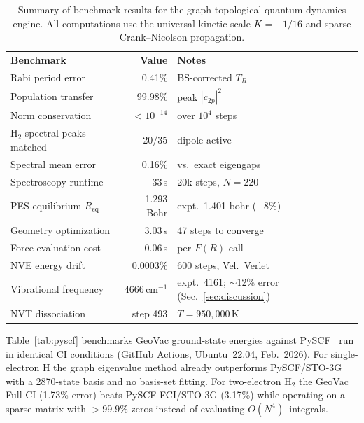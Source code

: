 \documentclass[aps,pra,twocolumn,superscriptaddress,longbibliography,floatfix]{revtex4-2}
\begin{document}
\begin{table}[tb]
  \caption{Summary of benchmark results for the graph-topological
  quantum dynamics engine. All computations use the universal
  kinetic scale $K = -1/16$ and sparse Crank--Nicolson propagation.}
  \label{tab:benchmarks}
  \begin{ruledtabular}
  \begin{tabular}{lrl}
    \textbf{Benchmark} & \textbf{Value} & \textbf{Notes} \\
    \colrule
    Rabi period error & 0.41\% & BS-corrected $T_R$ \\
    Population transfer & 99.98\% & peak $|c_{2p}|^2$ \\
    Norm conservation & $<10^{-14}$ & over $10^4$ steps \\
    \colrule
    H$_2$ spectral peaks matched & 20/35 & dipole-active \\
    Spectral mean error & 0.16\% & vs.\ exact eigengaps \\
    Spectroscopy runtime & 33\,s & 20k steps, $N=220$ \\
    \colrule
    PES equilibrium $R_{\mathrm{eq}}$ & 1.293 Bohr & expt.\ 1.401 bohr ($-8\%$) \\
    Geometry optimization & 3.03\,s & 47 steps to converge \\
    Force evaluation cost & 0.06\,s & per $F(R)$ call \\
    \colrule
    NVE energy drift & 0.0003\% & 600 steps, Vel.\ Verlet \\
    Vibrational frequency & 4666\,cm$^{-1}$ & expt.\ 4161; $\sim$12\% error (Sec.~\ref{sec:discussion}) \\
    NVT dissociation & step 493 & $T = 950{,}000$\,K \\
  \end{tabular}
  \end{ruledtabular}
\end{table}

Table~\ref{tab:pyscf} benchmarks GeoVac ground-state energies against
PySCF~\cite{Sun2020} run in identical CI conditions (GitHub Actions,
Ubuntu~22.04, Feb.~2026).  For single-electron H the graph eigenvalue
method already outperforms PySCF/STO-3G with a 2870-state basis and
no basis-set fitting.  For two-electron H$_2$ the GeoVac Full CI
(1.73\% error) beats PySCF FCI/STO-3G (3.17\%) while operating on a
sparse matrix with $>99.9\%$ zeros instead of evaluating
$O(N^4)$~integrals.
\end{document}
